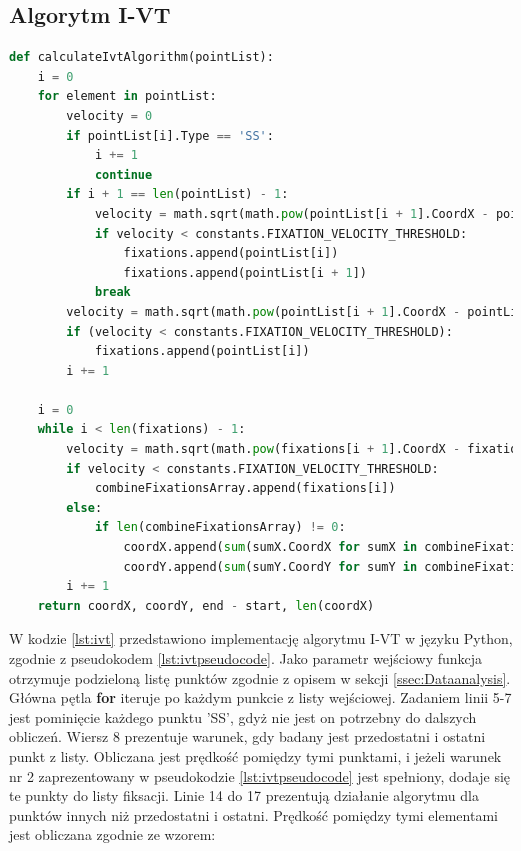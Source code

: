 \subsection{Algorytm I-VT}
\label{ssec:implementivt}
\begin{lstlisting}[language=Python, caption=Kod algorytmu I-VT, label={lst:ivt}]
def calculateIvtAlgorithm(pointList):
    i = 0
    for element in pointList:
        velocity = 0
        if pointList[i].Type == 'SS':
            i += 1
            continue
        if i + 1 == len(pointList) - 1:
            velocity = math.sqrt(math.pow(pointList[i + 1].CoordX - pointList[i].CoordX, 2) + math.pow(pointList[i + 1].CoordY - pointList[i].CoordY, 2))
            if velocity < constants.FIXATION_VELOCITY_THRESHOLD:
                fixations.append(pointList[i])
                fixations.append(pointList[i + 1])
            break
        velocity = math.sqrt(math.pow(pointList[i + 1].CoordX - pointList[i].CoordX, 2) + math.pow(pointList[i + 1].CoordY - pointList[i].CoordY, 2))
        if (velocity < constants.FIXATION_VELOCITY_THRESHOLD):
            fixations.append(pointList[i])
        i += 1
    
    i = 0
    while i < len(fixations) - 1:
        velocity = math.sqrt(math.pow(fixations[i + 1].CoordX - fixations[i].CoordX, 2) + math.pow(fixations[i + 1].CoordY - fixations[i].CoordY, 2))
        if velocity < constants.FIXATION_VELOCITY_THRESHOLD:
            combineFixationsArray.append(fixations[i])
        else:
            if len(combineFixationsArray) != 0:
                coordX.append(sum(sumX.CoordX for sumX in combineFixationsArray) / len(combineFixationsArray))
                coordY.append(sum(sumY.CoordY for sumY in combineFixationsArray) / len(combineFixationsArray))
        i += 1
    return coordX, coordY, end - start, len(coordX)
\end{lstlisting}
W kodzie \ref{lst:ivt} przedstawiono implementację algorytmu I-VT w języku Python, zgodnie z pseudokodem \ref{lst:ivtpseudocode}. Jako parametr wejściowy funkcja otrzymuje podzieloną listę punktów zgodnie z opisem w sekcji \ref{ssec:Dataanalysis}. Główna pętla \textbf{for} iteruje po każdym punkcie z listy wejściowej. Zadaniem linii 5-7 jest pominięcie każdego punktu 'SS', gdyż nie jest on potrzebny do dalszych obliczeń. Wiersz 8 prezentuje warunek, gdy badany jest przedostatni i ostatni punkt z listy. Obliczana jest prędkość pomiędzy tymi punktami, i jeżeli warunek nr 2 zaprezentowany w pseudokodzie \ref{lst:ivtpseudocode} jest spełniony, dodaje się te punkty do listy fiksacji. Linie 14 do 17 prezentują działanie algorytmu dla punktów innych niż przedostatni i ostatni. Prędkość pomiędzy tymi elementami jest obliczana zgodnie ze wzorem:
